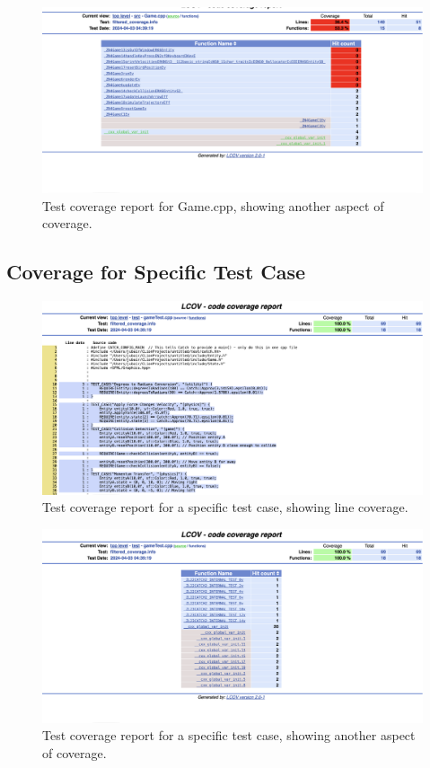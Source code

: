 \documentclass[12pt]{article}
\begin{document}
\begin{figure}[h!]
    \centering
    \includegraphics[width=\linewidth]{gamef.png}
    \caption{Test coverage report for Game.cpp, showing another aspect of coverage.}
    \label{fig:game_cpp_other_coverage}
\end{figure}
\FloatBarrier %

\subsection{Coverage for Specific Test Case}

\begin{figure}[h!]
    \centering
    \includegraphics[width=\linewidth]{testcls.png}
    \caption{Test coverage report for a specific test case, showing line coverage.}
    \label{fig:testcase_line_coverage}
\end{figure}

\begin{figure}[h!]
    \centering
    \includegraphics[width=\linewidth]{testc.png}
    \caption{Test coverage report for a specific test case, showing another aspect of coverage.}
    \label{fig:testcase_other_coverage}
\end{figure}
\FloatBarrier %
\end{document}

